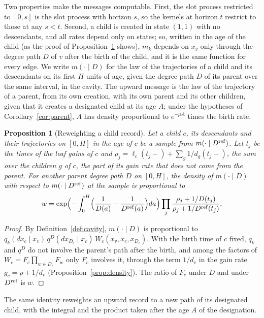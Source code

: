 \documentclass[11pt]{article}
\theoremstyle{plain}
\newtheorem{proposition}[theorem]{Proposition}
\theoremstyle{definition}
\theoremstyle{remark}
\begin{document}
Two properties make the messages computable. First, the slot process restricted to $[0,s]$ is the slot process with horizon $s$, so the kernels at horizon $t$ restrict to those at any $s<t$. Second, a child is created in state $(1,1)$ with no descendants, and all rates depend only on states; so, written in the age of the child (as the proof of Proposition~\ref{prop:reweight} shows), $m_k$ depends on $x_v$ only through the degree path $D$ of $v$ after the birth of the child, and it is the same function for every edge. We write $m(\cdot\mid D)$ for the law of the trajectories of a child and its descendants on its first $H$ units of age, given the degree path $D$ of its parent over the same interval, in the cavity. The upward message is the law of the trajectory of a parent, from its own creation, with its own parent and its other children, given that it creates a designated child at its age $A$; under the hypotheses of Corollary~\ref{cor:parent}, $A$ has density proportional to $e^{-\mu A}$ times the birth rate.

\begin{proposition}[Reweighting a child record]\label{prop:reweight}
Let a child $c$, its descendants and their trajectories on $[0,H]$ in the age of $c$ be a sample from $m(\cdot\mid D^{\rm ref})$. Let $t_j$ be the times of the leaf gains of $c$ and $\rho_j=\ell_c(t_j-)+\sum_g1/d_g(t_j-)$, the sum over the children $g$ of $c$, the part of its gain rate that does not come from the parent. For another parent degree path $D$ on $[0,H]$, the density of $m(\cdot\mid D)$ with respect to $m(\cdot\mid D^{\rm ref})$ at the sample is proportional to
\[
w=\exp\Bigl(-\int_0^H\Bigl(\frac1{D(a)}-\frac1{D^{\rm ref}(a)}\Bigr)da\Bigr)\prod_j\frac{\rho_j+1/D(t_j)}{\rho_j+1/D^{\rm ref}(t_j)} .
\]
\end{proposition}

\begin{proof}
By Definition~\ref{def:cavity}, $m(\cdot\mid D)$ is proportional to $q_k(dx_c\mid x_v)\,q^D(dx_{D_c}\mid x_c)\,W_c(x_v,x_c,x_{D_c})$. With the birth time of $c$ fixed, $q_k$ and $q^D$ do not involve the parent's path after the birth, and among the factors of $W_c=F_c\prod_{w\in D_c}F_w$ only $F_c$ involves it, through the term $1/d_v$ in the gain rate $g_c=\rho+1/d_v$ (Proposition~\ref{prop:density}). The ratio of $F_c$ under $D$ and under $D^{\rm ref}$ is $w$.
\end{proof}

The same identity reweights an upward record to a new path of its designated child, with the integral and the product taken after the age $A$ of the designation.
\end{document}
